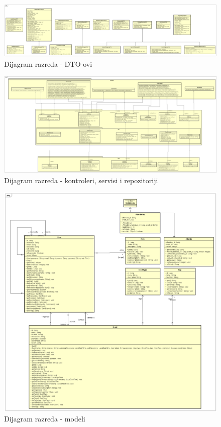 			
			\begin{figure}[h]
				\includegraphics[width=\textwidth]{dijagrami/RAZREDNI - DTO dijagram.png}
				\caption{Dijagram razreda - DTO-ovi}
			\end{figure}
		
		    \begin{figure}[H]
		    	\includegraphics[width=\textwidth]{dijagrami/RAZREDNI - Controller - Service - Repo.png}
		    	\caption{Dijagram razreda - kontroleri, servisi i repozitoriji}
		    \end{figure}
			
			\begin{figure}[H]
				\includegraphics[width=\textwidth]{dijagrami/RAZREDNI - Dijagram modela.png}
				\caption{Dijagram razreda - modeli}
			\end{figure}
		
